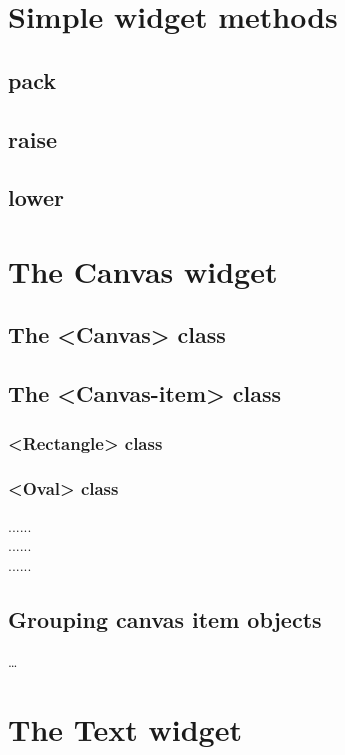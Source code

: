 \documentclass[10pt]{report}
\begin{document}


\chapter{Simple widget methods}
\section{pack}
\section{raise}
\section{lower}

\chapter{The Canvas widget}

\section{The <Canvas> class}

\section{The <Canvas-item> class}
\subsection{<Rectangle> class}
\subsection{<Oval> class}

......\\
......\\
......
\section{Grouping canvas item objects}

\ldots
\chapter{The Text widget}
\end{document}
